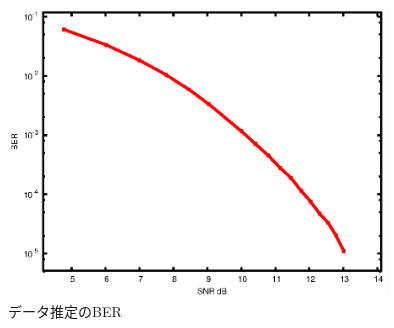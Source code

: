 \begin{figure}[htbp]
  \begin{center}
    \includegraphics[clip,width=10.0cm]{./sn_bit_err.eps}
    \caption{データ推定のBER}
    \label{fig:sn_bit_err}
  \end{center}
\end{figure}